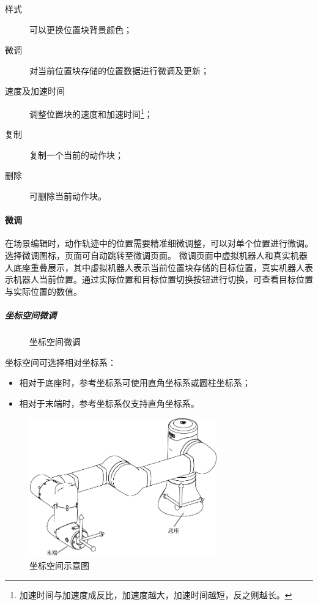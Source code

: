 \begin{description}
\item [样式] 可以更换位置块背景颜色；
\item [微调] 对当前位置块存储的位置数据进行微调及更新；
\item [速度及加速时间] 调整位置块的速度和加速时间\footnote{加速时间与加速度成反比，加速度越大，加速时间越短，反之则越长。}；
\item [复制] 复制一个当前的动作块；
\item [删除] 可删除当前动作块。
\end{description}

\paragraph{微调}
\label{sec:微调}
在场景编辑时，动作轨迹中的位置需要精准细微调整，可以对单个位置进行微调。选择微调图标，页面可自动跳转至微调页面。
微调页面中虚拟机器人和真实机器人底座重叠展示，其中虚拟机器人表示当前位置块存储的目标位置，真实机器人表示机器人当前位置。通过实际位置和目标位置切换按钮{\color{red}{缺图}}进行切换，可查看目标位置与实际位置的数值。

\subparagraph{坐标空间微调}

\begin{figure}[ht]
	\centering
	\color{red}{缺图}
	\caption{坐标空间微调}
	\label{fig:坐标空间微调}
\end{figure}

坐标空间可选择相对坐标系：
\begin{itemize}
	\item 相对于底座时，参考坐标系可使用直角坐标系或圆柱坐标系；
	\item 相对于末端时，参考坐标系仅支持直角坐标系。
\end{itemize}

\begin{figure}[ht]
	\centering
	\includegraphics[height=6cm]{line_graphs/fine_tuning_coordinate.pdf}
	\caption{坐标空间示意图}
	\label{fig:坐标空间示意图}
\end{figure}

